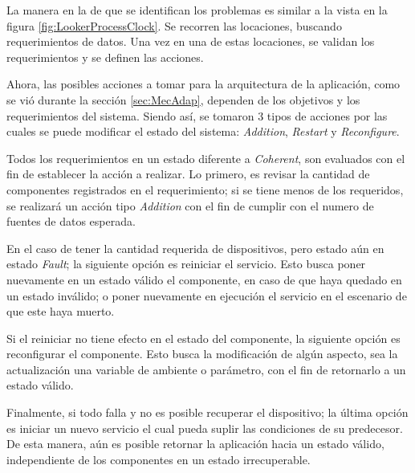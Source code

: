 La manera en la de que se identifican los problemas es similar a la vista en la figura \ref{fig:LookerProcessClock}. Se recorren las locaciones, buscando requerimientos de datos. Una vez en una de estas locaciones, se validan los requerimientos y se definen las acciones.

Ahora, las posibles acciones a tomar para la arquitectura de la aplicación, como se vió durante la sección \ref{sec:MecAdap}, dependen de los objetivos y los requerimientos del sistema. Siendo así, se tomaron 3 tipos de acciones por las cuales se puede modificar el estado del sistema: \textit{Addition}, \textit{Restart} y \textit{Reconfigure}.

Todos los requerimientos en un estado diferente a \textit{Coherent}, son evaluados con el fin de establecer la acción a realizar. Lo primero, es revisar la cantidad de componentes registrados en el requerimiento; si se tiene menos de los requeridos, se realizará un acción tipo \textit{Addition} con el fin de cumplir con el numero de fuentes de datos esperada.

En el caso de tener la cantidad requerida de dispositivos, pero estado aún en estado \textit{Fault}; la siguiente opción es reiniciar el servicio. Esto busca poner nuevamente en un estado válido el componente, en caso de que haya quedado en un estado inválido; o poner nuevamente en ejecución el servicio en el escenario de que este haya muerto.

Si el reiniciar no tiene efecto en el estado del componente, la siguiente opción es reconfigurar el componente. Esto busca la modificación de algún aspecto, sea la actualización una variable de ambiente o parámetro, con el fin de retornarlo a un estado válido. 
 
Finalmente, si todo falla y no es posible recuperar el dispositivo; la última opción es iniciar un nuevo servicio el cual pueda suplir las condiciones de su predecesor. De esta manera, aún es posible retornar la aplicación hacia un estado válido, independiente de los componentes en un estado irrecuperable.

